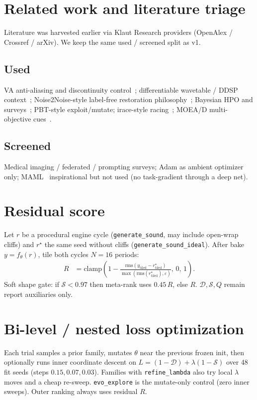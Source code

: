 \documentclass[11pt,a4paper]{article}
\begin{document}
\section{Related work and literature triage}
Literature was harvested earlier via Klaut Research providers (OpenAlex / Crossref /
arXiv). We keep the same used / screened split as v1.

\subsection{Used}
VA anti-aliasing and discontinuity control~\cite{valimaki2006va,esqueda2016aliasing,esqueda2016blamp};
differentiable wavetable / DDSP context~\cite{shan2021dwt}; Noise2Noise-style
label-free restoration philosophy~\cite{lehtinen2018n2n}; Bayesian HPO and
surveys~\cite{snoek2012bo,bischl2023hpo}; PBT-style exploit/mutate; irace-style
racing~\cite{lopez2016irace}; MOEA/D multi-objective cues~\cite{zhang2007moead}.

\subsection{Screened}
Medical imaging / federated / prompting surveys; Adam as ambient optimizer only;
MAML~\cite{finn2017maml} inspirational but not used (no task-gradient through a
deep net).

\section{Residual score}
Let $r$ be a procedural engine cycle (\texttt{generate\_sound}, may include
open-wrap cliffs) and $r^\star$ the same seed without cliffs
(\texttt{generate\_sound\_ideal}). After bake $y=f_\theta(r)$, tile both cycles
$N{=}16$ periods:
\begin{align}
R &= \mathrm{clamp}\!\left(
  1 - \frac{\mathrm{rms}(y_{\mathrm{tiled}}-r^\star_{\mathrm{tiled}})}
           {\max(\mathrm{rms}(r^\star_{\mathrm{tiled}}),\varepsilon)},
  \,0,\,1\right).
\end{align}
Soft shape gate: if $\mathcal{S}<0.97$ then meta-rank uses $0.45\,R$, else $R$.
$\mathcal{D},\mathcal{S},Q$ remain report auxiliaries only.

\section{Bi-level / nested loss optimization}
Each trial samples a prior family, mutates $\theta$ near the previous frozen
init, then optionally runs inner coordinate descent on
$L=(1-\mathcal{D})+\lambda(1-\mathcal{S})$ over 48 fit seeds (steps
$0.15,0.07,0.03$). Families with \texttt{refine\_lambda} also try local $\lambda$
moves and a cheap re-sweep. \texttt{evo\_explore} is the mutate-only control
(zero inner sweeps). Outer ranking always uses residual $R$.
\end{document}
